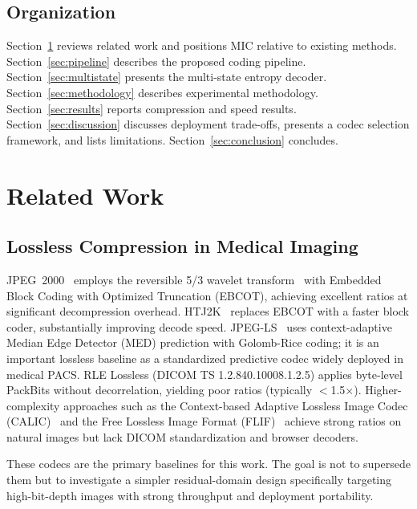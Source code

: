 \documentclass[journal]{IEEEtran}
\begin{document}
\subsection{Organization}

Section~\ref{sec:related} reviews related work and positions MIC relative to
existing methods. Section~\ref{sec:pipeline} describes the proposed coding
pipeline. Section~\ref{sec:multistate} presents the multi-state entropy decoder.
Section~\ref{sec:methodology} describes experimental methodology.
Section~\ref{sec:results} reports compression and speed results.
Section~\ref{sec:discussion} discusses deployment trade-offs, presents a
codec selection framework, and lists limitations.
Section~\ref{sec:conclusion} concludes.

\section{Related Work}
\label{sec:related}

\subsection{Lossless Compression in Medical Imaging}

JPEG~2000~\cite{taubman2002} employs the reversible 5/3 wavelet
transform~\cite{legall1988,calderbank1998} with Embedded Block Coding with
Optimized Truncation (EBCOT), achieving excellent ratios at significant
decompression overhead. HTJ2K~\cite{htj2k2019,taubman2022}
replaces EBCOT with a faster block coder, substantially improving decode
speed. JPEG-LS~\cite{loco1,jpegls2} uses context-adaptive Median Edge
Detector (MED) prediction with Golomb-Rice coding; it is an important
lossless baseline as a standardized predictive codec widely deployed in
medical PACS. RLE Lossless (DICOM TS 1.2.840.10008.1.2.5) applies
byte-level PackBits without decorrelation, yielding poor ratios
(typically $<$1.5$\times$). Higher-complexity approaches such as the
Context-based Adaptive Lossless Image Codec (CALIC)~\cite{wu1997} and the
Free Lossless Image Format (FLIF)~\cite{sneyers2016} achieve strong ratios on
natural images but lack DICOM standardization and browser decoders.

These codecs are the primary baselines for this work. The goal is not to
supersede them but to investigate a simpler residual-domain design specifically
targeting high-bit-depth images with strong throughput and deployment
portability.
\end{document}
